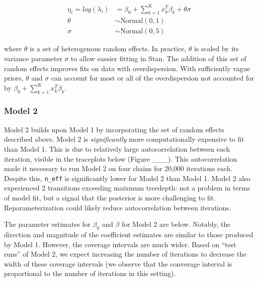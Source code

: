 \documentclass[]{article}
\begin{document}
\[
\begin{aligned}
\eta_i = log(\lambda_i) & = \beta_0 + \sum_{k=1}^{K}x_k^T\beta_k + \theta\sigma \\
\theta &\sim \text{Normal}(0, 1) \\
\sigma &\sim \text{Normal}(0, 5)
\end{aligned}
\]

where \(\theta\) is a set of heterogenous random effects. In practice,
\(\theta\) is scaled by its variance parameter \(\sigma\) to allow
eassier fitting in Stan. The addition of this set of random effects
improves fits on data with overdispersion. With sufficiently vague
priors, \(\theta\) and \(\sigma\) can account for most or all of the
overdispersion not accounted for by
\(\beta_0 + \sum_{k=1}^{K}x_k^T\beta_k\).

\subsubsection{Model 2}\label{model-2}

Model 2 builds upon Model 1 by incorporating the set of random effects
described above. Model 2 is \emph{significantly} more computationally
expensive to fit than Model 1. This is due to relatively large
autocorrelation between each iteration, visible in the traceplots below
(Figure \_\_\_). This autocorrelation made it necessary to run Model 2
on four chains for 20,000 iterations each. Despite this, \texttt{n\_eff}
is significantly lower for Model 2 than Model 1. Model 2 also
experienced 2 transitions exceeding maixmum treedepth: not a problem in
terms of model fit, but a signal that the posterior is more challenging
to fit. Reparameterization could likely reduce autocorrelation between
iterations.

The parameter estimates for \(\beta_0\) and \(\beta\) for Model 2 are
below. Notably, the direction and magnitude of the coefficient estimates
are similar to those produced by Model 1. However, the coverage
intervals are much wider. Based on ``test runs'' of Model 2, we expect
increasing the number of iterations to decrease the width of these
coverage intervals (we observe that the converage interval is
proportional to the number of iterations in this setting).
\end{document}
